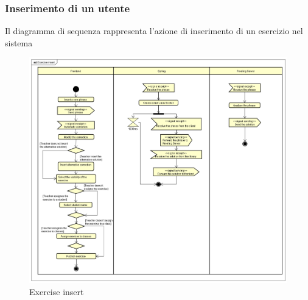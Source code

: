 \subsubsection{Inserimento di un utente}
Il diagramma di sequenza rappresenta l'azione di inserimento di un esercizio nel sistema
\begin{figure}[H]
\centering
\includegraphics[width=17cm, keepaspectratio]{img/Exercise-insert.png} 
\caption{Exercise insert}
\end{figure}


